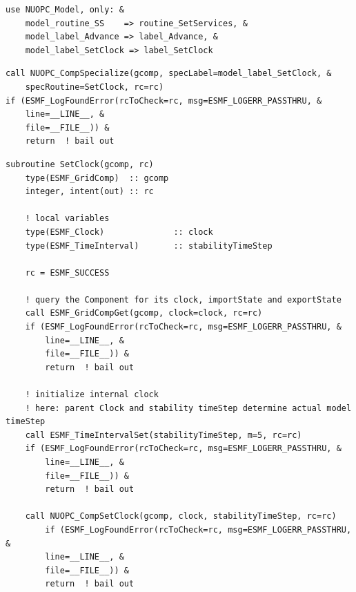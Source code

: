 \documentclass[oneside,11pt]{memoir}
\begin{document}
\begin{enumerate}
\vspace{24pt}
\begin{lstlisting}[label={lst:gen1}, caption=An updated Use statement with the import of \texttt{label\_SetClock} added (line 4).]
use NUOPC_Model, only: &
    model_routine_SS    => routine_SetServices, &
    model_label_Advance => label_Advance, &
    model_label_SetClock => label_SetClock
\end{lstlisting}

\vspace{24pt}
\begin{lstlisting}[label={lst:gen2}, caption=A call to register the generated subroutine as the SetClock specialization point. This call is inserted at the end of the \texttt{SetServices} method.]
call NUOPC_CompSpecialize(gcomp, specLabel=model_label_SetClock, &
    specRoutine=SetClock, rc=rc)
if (ESMF_LogFoundError(rcToCheck=rc, msg=ESMF_LOGERR_PASSTHRU, &
    line=__LINE__, &
    file=__FILE__)) &
    return  ! bail out
\end{lstlisting}

\vspace{24pt}
\begin{lstlisting}[label={lst:gen3}, caption=A subroutine template that implements the SetClock specialization point. The subroutine is inserted at the end of the module.]
subroutine SetClock(gcomp, rc)
    type(ESMF_GridComp)  :: gcomp
    integer, intent(out) :: rc

    ! local variables
    type(ESMF_Clock)              :: clock
    type(ESMF_TimeInterval)       :: stabilityTimeStep

    rc = ESMF_SUCCESS

    ! query the Component for its clock, importState and exportState
    call ESMF_GridCompGet(gcomp, clock=clock, rc=rc)
    if (ESMF_LogFoundError(rcToCheck=rc, msg=ESMF_LOGERR_PASSTHRU, &
        line=__LINE__, &
        file=__FILE__)) &
        return  ! bail out

    ! initialize internal clock
    ! here: parent Clock and stability timeStep determine actual model timeStep
    call ESMF_TimeIntervalSet(stabilityTimeStep, m=5, rc=rc)
    if (ESMF_LogFoundError(rcToCheck=rc, msg=ESMF_LOGERR_PASSTHRU, &
        line=__LINE__, &
        file=__FILE__)) &
        return  ! bail out

    call NUOPC_CompSetClock(gcomp, clock, stabilityTimeStep, rc=rc)
		if (ESMF_LogFoundError(rcToCheck=rc, msg=ESMF_LOGERR_PASSTHRU, &
        line=__LINE__, &
        file=__FILE__)) &
        return  ! bail out


\end{lstlisting}
\end{enumerate}
\end{document}
